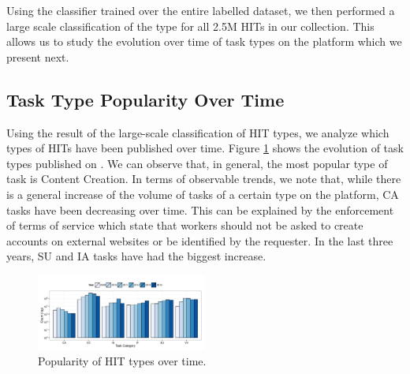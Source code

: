 Using the classifier trained over the entire labelled dataset, we then performed a large scale classification of the type for all 2.5M HITs in our collection. This allows us to study the evolution over time of task types on the \amt{} platform which we present next.

\subsection{Task Type Popularity Over Time}
Using the result of the large-scale classification of HIT types, we  analyze which  types of HITs have been published over time.
Figure \ref{fig:cat_trends} shows the evolution of task types published on \amt{}.
% 
We can observe that, in general, the most popular type of task is Content Creation.
% 
In terms of observable trends, we note that, while there is a general increase of the volume of tasks of a certain type on the platform,  CA tasks have been decreasing over time. This can be explained  by the enforcement of \amt{} terms of service which state that workers should not be asked to create accounts on external websites or be identified by the requester.
% 
In the last three years, SU and IA tasks have had the biggest increase.

\begin{figure}[htbp]
	\centering
		\includegraphics[width=0.5\textwidth]{figures/category_trends}
	\caption{Popularity of HIT types over time.}
	\label{fig:cat_trends}
\end{figure}

